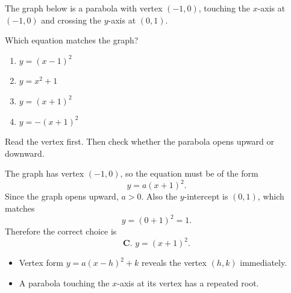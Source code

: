\begin{problem}
The graph below is a parabola with vertex $(-1,0)$, touching the $x$-axis at $(-1,0)$ and crossing the $y$-axis at $(0,1)$.

\begin{center}
\end{center}

Which equation matches the graph?
\begin{enumerate}[label=\textbf{\Alph*.}]
\item $y=(x-1)^2$
\item $y=x^2+1$
\item $y=(x+1)^2$
\item $y=-(x+1)^2$
\end{enumerate}
\end{problem}

\begin{hint}
Read the vertex first. Then check whether the parabola opens upward or downward.
\end{hint}

\begin{solution}
The graph has vertex $(-1,0)$, so the equation must be of the form
\[
y=a(x+1)^2.
\]
Since the graph opens upward, $a>0$. Also the $y$-intercept is $(0,1)$, which matches
\[
y=(0+1)^2=1.
\]
Therefore the correct choice is
\[
\boxed{\textbf{C. } y=(x+1)^2.}
\]
\end{solution}

\begin{takeaways}
\begin{itemize}[leftmargin=*]
\item Vertex form $y=a(x-h)^2+k$ reveals the vertex $(h,k)$ immediately.
\item A parabola touching the $x$-axis at its vertex has a repeated root.
\end{itemize}
\end{takeaways}

